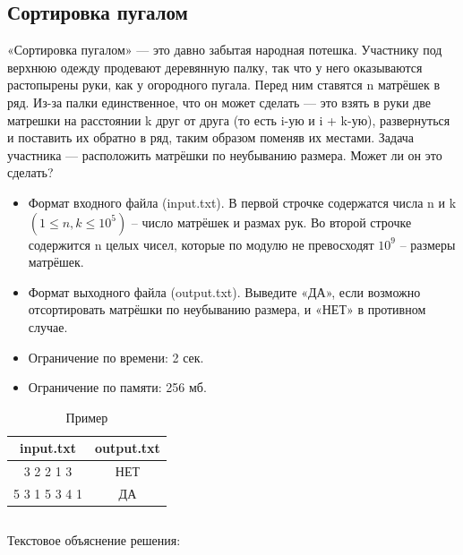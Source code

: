\subsection{Сортировка пугалом}
«Сортировка пугалом» — это давно забытая народная потешка. Участнику
под верхнюю одежду продевают деревянную палку, так что у него оказываются растопырены руки, как у огородного пугала. Перед ним ставятся n матрёшек в ряд. Из-за палки единственное, что он может сделать — это взять в руки две матрешки на расстоянии k друг от друга (то есть i-ую и i + k-ую), развернуться и поставить их обратно в ряд, таким образом поменяв их местами.
Задача участника — расположить матрёшки по неубыванию размера. Может ли он это сделать?

\begin{itemize}
	\item Формат входного файла (input.txt). В первой строчке содержатся числа n и k $(1 \le n, k \le 10^5)$ – число матрёшек и размах рук. Во второй строчке содержится n целых чисел, которые по модулю не превосходят $10^9$ – размеры матрёшек.
	\item Формат выходного файла (output.txt). Выведите «ДА», если возможно отсортировать матрёшки по неубыванию размера, и «НЕТ» в противном случае.
	\item Ограничение по времени: 2 сек.
        \item Ограничение по памяти: 256 мб.

\end{itemize}

\begin{table}[H]
    \caption{Пример}
	\begin{center}
		\begin{tabular}{|c|c|}
			\hline
			  input.txt  &  output.txt \\ \hline
			    3 2 2 1 3  & НЕТ \\ \hline
                5 3 1 5 3 4 1  & ДА \\ \hline
		\end{tabular}
		\label{tabular:tab_examp_2}
	\end{center}
\end{table}

\begin{code}
	\inputminted[breaklines=true, xleftmargin=1em, linenos, frame=single, framesep=10pt, fontsize=\footnotesize, firstline=1, lastline=35]{haskell}{listings/2.py}
	\caption{Код первой дополнительной задачи}
\end{code}
Текстовое объяснение решения:

